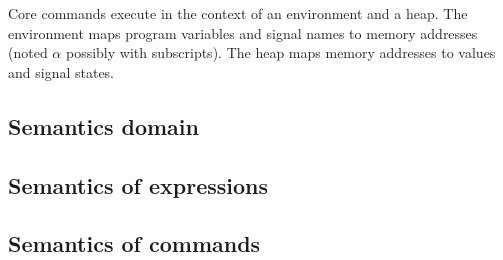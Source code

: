 Core \sail{} commands execute in the context of an environment and a heap. The environment maps program
variables and signal names to memory addresses (noted $\alpha$ possibly with subscripts).
The heap maps memory addresses to values and signal states.

\subsection{Semantics domain}


\subsection{Semantics of expressions}


\subsection{Semantics of commands}




